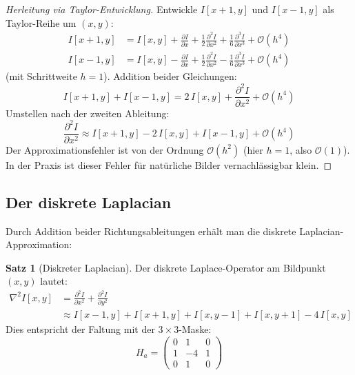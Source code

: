 ﻿\documentclass[a4paper,12pt]{article}
\theoremstyle{definition}
\newtheorem{satz}{Satz}
\begin{document}
\begin{proof}[Herleitung via Taylor-Entwicklung]
    Entwickle $I[x+1,y]$ und $I[x-1,y]$ als Taylor-Reihe um $(x,y)$:
    \begin{align*}
        I[x+1,y] &= I[x,y] + \frac{\partial I}{\partial x} + \frac{1}{2}\frac{\partial^2 I}{\partial x^2}
                    + \frac{1}{6}\frac{\partial^3 I}{\partial x^3} + \mathcal{O}(h^4) \\
        I[x-1,y] &= I[x,y] - \frac{\partial I}{\partial x} + \frac{1}{2}\frac{\partial^2 I}{\partial x^2}
                    - \frac{1}{6}\frac{\partial^3 I}{\partial x^3} + \mathcal{O}(h^4)
    \end{align*}
    (mit Schrittweite $h=1$). Addition beider Gleichungen:
    \[
        I[x+1,y] + I[x-1,y] = 2\,I[x,y] + \frac{\partial^2 I}{\partial x^2} + \mathcal{O}(h^4)
    \]
    Umstellen nach der zweiten Ableitung:
    \[
        \frac{\partial^2 I}{\partial x^2} \approx I[x+1,y] - 2\,I[x,y] + I[x-1,y] + \mathcal{O}(h^4)
    \]
    Der Approximationsfehler ist von der Ordnung $\mathcal{O}(h^2)$ (hier $h=1$, also $\mathcal{O}(1)$).
    In der Praxis ist dieser Fehler für natürliche Bilder vernachlässigbar klein. \qedhere
\end{proof}

\subsection{Der diskrete Laplacian}

Durch Addition beider Richtungsableitungen erhält man die diskrete Laplacian-Approximation:

\begin{satz}[Diskreter Laplacian]
\label{satz:diskret}
    Der diskrete Laplace-Operator am Bildpunkt $(x,y)$ lautet:
    \begin{align}
        \nabla^2 I[x,y] &= \frac{\partial^2 I}{\partial x^2} + \frac{\partial^2 I}{\partial y^2}
        \nonumber \\
        &\approx I[x-1,y] + I[x+1,y] + I[x,y-1] + I[x,y+1] - 4\,I[x,y]
        \label{eq:laplacian}
    \end{align}
    Dies entspricht der Faltung mit der $3\times3$-Maske:
    \[
        H_a = \begin{pmatrix} 0 & 1 & 0 \\ 1 & -4 & 1 \\ 0 & 1 & 0 \end{pmatrix}
    \]
\end{satz}
\end{document}
